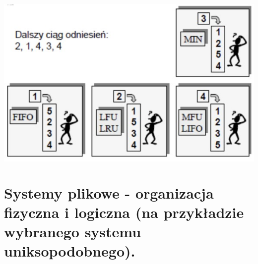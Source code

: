 \documentclass[12pt]{article}
\begin{document}
    \begin{center}
            \includegraphics[scale=0.4]{graphics/paging/paging-2.jpg}
    \end{center}

    \newpage
    
    \section{Systemy plikowe - organizacja fizyczna i logiczna (na przykładzie wybranego systemu uniksopodobnego).}
    
\end{document}

